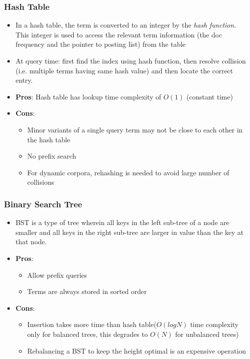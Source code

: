 \documentclass{article}
\begin{document}
\subsubsection{Hash Table}
\begin{itemize}
    
    \item In a hash table, the term is converted to an integer by the \textit{hash function}. This integer is used to access the relevant term information (the doc frequency and the pointer to posting list) from the table
    
    \item At query time: first find the index using hash function, then resolve collision (i.e. multiple terms having same hash value) and then locate the correct entry.
    
    \item \textbf{Pros}: Hash table has lookup time complexity of $O(1)$ (constant time)
    
    \item \textbf{Cons}: 
    \begin{itemize}
        \item Minor variants of a single query term may not be close to each other in the hash table
        
        \item No prefix search
        
        \item For dynamic corpora, rehashing is needed to avoid large number of collisions
    \end{itemize}
\end{itemize}

\subsubsection{Binary Search Tree}
\begin{itemize}
    \item BST is a type of tree wherein all keys in the left sub-tree of a node are smaller and all keys in the right sub-tree are larger in value than the key at that node.
    
    \item \textbf{Pros}: 
    \begin{itemize}
        \item Allow prefix queries
        
        \item Terms are always stored in sorted order
    \end{itemize}
    
    \item \textbf{Cons}:
    \begin{itemize}
        \item Insertion takes more time than hash table($O(log N)$ time complexity only for balanced trees, this degrades to $O(N)$ for unbalanced trees)
        
        \item Rebalancing a BST to keep the height optimal is an expensive operation
    \end{itemize}
\end{itemize}
\end{document}
